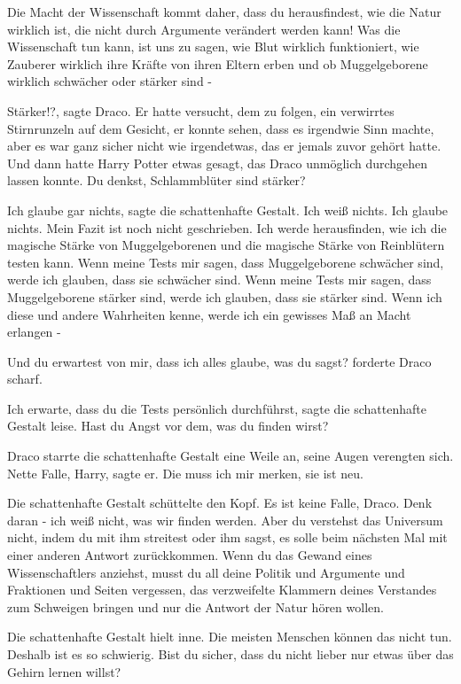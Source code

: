 Die Macht der Wissenschaft kommt daher, dass du herausfindest, wie die Natur
wirklich ist, die nicht durch Argumente verändert werden kann! Was die
Wissenschaft tun kann, ist uns zu sagen, wie Blut wirklich funktioniert, wie
Zauberer wirklich ihre Kräfte von ihren Eltern erben und ob Muggelgeborene
wirklich schwächer oder stärker sind -\grqq{}

\glqq Stärker!?\grqq{}, sagte Draco. Er hatte versucht, dem zu folgen, ein
verwirrtes Stirnrunzeln auf dem Gesicht, er konnte sehen, dass es irgendwie Sinn
machte, aber es war ganz sicher nicht wie irgendetwas, das er jemals zuvor
gehört hatte. Und dann hatte Harry Potter etwas gesagt, das Draco unmöglich
durchgehen lassen konnte. \glqq Du denkst, Schlammblüter sind stärker?\grqq{}

\glqq Ich glaube gar nichts\grqq{}, sagte die schattenhafte Gestalt. \glqq Ich
weiß nichts. Ich glaube nichts. Mein Fazit ist noch nicht geschrieben. Ich werde
herausfinden, wie ich die magische Stärke von Muggelgeborenen und die magische
Stärke von Reinblütern testen kann. Wenn meine Tests mir sagen, dass
Muggelgeborene schwächer sind, werde ich glauben, dass sie schwächer sind. Wenn
meine Tests mir sagen, dass Muggelgeborene stärker sind, werde ich glauben, dass
sie stärker sind. Wenn ich diese und andere Wahrheiten kenne, werde ich ein
gewisses Maß an Macht erlangen -\grqq{}

\glqq Und du erwartest von mir, dass ich alles glaube, was du sagst?\grqq{}
forderte Draco scharf.

\glqq Ich erwarte, dass du die Tests persönlich durchführst\grqq{}, sagte die
schattenhafte Gestalt leise. \glqq Hast du Angst vor dem, was du finden
wirst?\grqq{}

Draco starrte die schattenhafte Gestalt eine Weile an, seine Augen verengten
sich. \glqq Nette Falle, Harry\grqq{}, sagte er. \glqq Die muss ich mir merken,
sie ist neu.\grqq{}

Die schattenhafte Gestalt schüttelte den Kopf. \glqq Es ist keine Falle, Draco.
Denk daran - ich weiß nicht, was wir finden werden. Aber du verstehst das
Universum nicht, indem du mit ihm streitest oder ihm sagst, es solle beim
nächsten Mal mit einer anderen Antwort zurückkommen. Wenn du das Gewand eines
Wissenschaftlers anziehst, musst du all deine Politik und Argumente und
Fraktionen und Seiten vergessen, das verzweifelte Klammern deines Verstandes zum
Schweigen bringen und nur die Antwort der Natur hören wollen.\grqq{}

Die schattenhafte Gestalt hielt inne. \glqq Die meisten Menschen können das
nicht tun. Deshalb ist es so schwierig. Bist du sicher, dass du nicht lieber nur
etwas über das Gehirn lernen willst?\grqq{}

